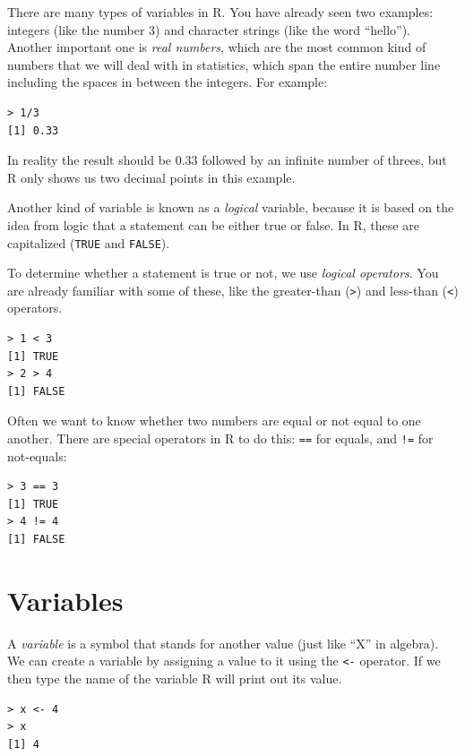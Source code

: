 \documentclass[12pt,]{book}
\begin{document}
There are many types of variables in R. You have already seen two examples: integers (like the number 3) and character strings (like the word ``hello''). Another important one is \emph{real numbers}, which are the most common kind of numbers that we will deal with in statistics, which span the entire number line including the spaces in between the integers. For example:

\begin{verbatim}
> 1/3
[1] 0.33
\end{verbatim}

In reality the result should be 0.33 followed by an infinite number of threes, but R only shows us two decimal points in this example.

Another kind of variable is known as a \emph{logical} variable, because it is based on the idea from logic that a statement can be either true or false. In R, these are capitalized (\texttt{TRUE} and \texttt{FALSE}).

To determine whether a statement is true or not, we use \emph{logical operators}. You are already familiar with some of these, like the greater-than (\texttt{\textgreater{}}) and less-than (\texttt{\textless{}}) operators.

\begin{verbatim}
> 1 < 3
[1] TRUE
> 2 > 4
[1] FALSE
\end{verbatim}

Often we want to know whether two numbers are equal or not equal to one another. There are special operators in R to do this: \texttt{==} for equals, and \texttt{!=} for not-equals:

\begin{verbatim}
> 3 == 3
[1] TRUE
> 4 != 4
[1] FALSE
\end{verbatim}

\hypertarget{variables}{%
\section{Variables}\label{variables}}

A \emph{variable} is a symbol that stands for another value (just like ``X'' in algebra). We can create a variable by assigning a value to it using the \texttt{\textless{}-} operator. If we then type the name of the variable R will print out its value.

\begin{verbatim}
> x <- 4
> x
[1] 4
\end{verbatim}
\end{document}
